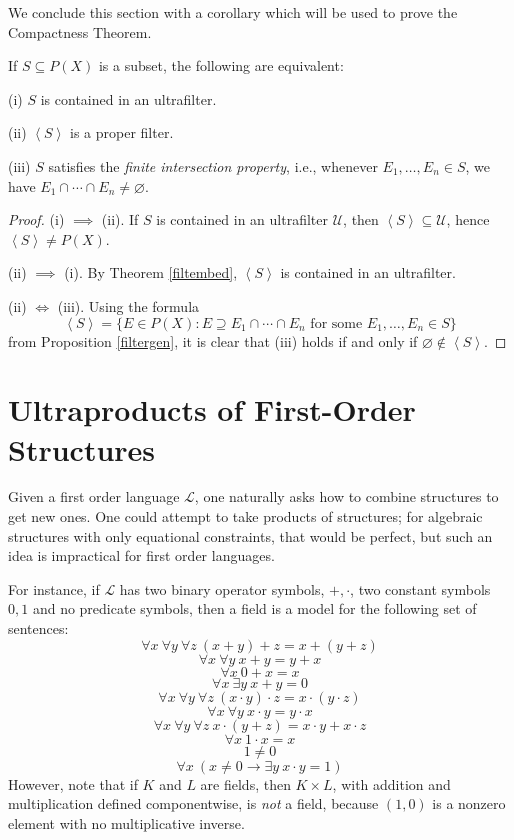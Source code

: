 \documentclass{article}
\def\Lang{\mathcal L}
\def\U{\mathscr U}
\begin{document}
\noindent We conclude this section with a corollary which will be used to prove the Compactness Theorem. %
\begin{corollary}\label{finiteinter}
If $S\subseteq P(X)$ is a subset, the following are equivalent:

(i) $S$ is contained in an ultrafilter.

(ii) $\left<S\right>$ is a proper filter.

(iii) $S$ satisfies the \emph{finite intersection property}, i.e., whenever $E_1,\dots,E_n\in S$, we have $E_1\cap\cdots\cap E_n\ne\varnothing$.
\end{corollary}
\begin{proof}
(i) $\implies$ (ii). If $S$ is contained in an ultrafilter $\U$, then $\left<S\right>\subseteq\U$, hence $\left<S\right>\ne P(X)$.

(ii) $\implies$ (i). By Theorem \ref{filtembed}, $\left<S\right>$ is contained in an ultrafilter.

(ii) $\iff$ (iii). Using the formula
$$\left<S\right>=\{E\in P(X):E\supseteq E_1\cap\cdots\cap E_n\text{ for some }E_1,\dots,E_n\in S\}$$
from Proposition \ref{filtergen}, it is clear that (iii) holds if and only if $\varnothing\notin\left<S\right>$.
\end{proof}

\section*{Ultraproducts of First-Order Structures}

Given a first order language $\Lang$, one naturally asks how to combine structures to get new ones.  One could attempt to take products of structures; for algebraic structures with only equational constraints, that would be perfect, but such an idea is impractical for first order languages.

For instance, if $\Lang$ has two binary operator symbols, $+,\cdot$, two constant symbols $0,1$ and no predicate symbols, then a field is a model for the following set of sentences:
$$\forall x~\forall y~\forall z~(x+y)+z=x+(y+z)$$
$$\forall x~\forall y~x+y=y+x$$
$$\forall x~0+x=x$$
$$\forall x~\exists y~x+y=0$$
$$\forall x~\forall y~\forall z~(x\cdot y)\cdot z=x\cdot(y\cdot z)$$
$$\forall x~\forall y~x\cdot y=y\cdot x$$
$$\forall x~\forall y~\forall z~x\cdot(y+z)=x\cdot y+x\cdot z$$
$$\forall x~1\cdot x=x$$
$$1\ne 0$$
$$\forall x~(x\ne 0\to\exists y~x\cdot y=1)$$
However, note that if $K$ and $L$ are fields, then $K\times L$, with addition and multiplication defined componentwise, is \emph{not} a field, because $(1,0)$ is a nonzero element with no multiplicative inverse.
\end{document}
